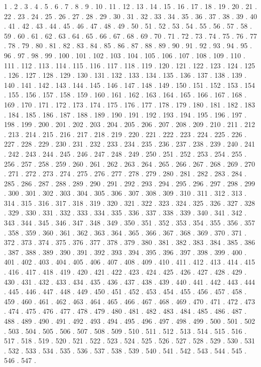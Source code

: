\documentclass[10pt]{article}
\begin{document}
\begin{Schunk}
\begin{Soutput}
1 . 2 . 3 . 4 . 5 . 6 . 7 . 8 . 9 . 10 . 11 . 12 . 13 . 14 . 15 . 16 . 17 . 18 . 19 . 20 . 21 . 22 . 23 . 24 . 25 . 26 . 27 . 28 . 29 . 30 . 31 . 32 . 33 . 34 . 35 . 36 . 37 . 38 . 39 . 40 . 41 . 42 . 43 . 44 . 45 . 46 . 47 . 48 . 49 . 50 . 51 . 52 . 53 . 54 . 55 . 56 . 57 . 58 . 59 . 60 . 61 . 62 . 63 . 64 . 65 . 66 . 67 . 68 . 69 . 70 . 71 . 72 . 73 . 74 . 75 . 76 . 77 . 78 . 79 . 80 . 81 . 82 . 83 . 84 . 85 . 86 . 87 . 88 . 89 . 90 . 91 . 92 . 93 . 94 . 95 . 96 . 97 . 98 . 99 . 100 . 101 . 102 . 103 . 104 . 105 . 106 . 107 . 108 . 109 . 110 . 111 . 112 . 113 . 114 . 115 . 116 . 117 . 118 . 119 . 120 . 121 . 122 . 123 . 124 . 125 . 126 . 127 . 128 . 129 . 130 . 131 . 132 . 133 . 134 . 135 . 136 . 137 . 138 . 139 . 140 . 141 . 142 . 143 . 144 . 145 . 146 . 147 . 148 . 149 . 150 . 151 . 152 . 153 . 154 . 155 . 156 . 157 . 158 . 159 . 160 . 161 . 162 . 163 . 164 . 165 . 166 . 167 . 168 . 169 . 170 . 171 . 172 . 173 . 174 . 175 . 176 . 177 . 178 . 179 . 180 . 181 . 182 . 183 . 184 . 185 . 186 . 187 . 188 . 189 . 190 . 191 . 192 . 193 . 194 . 195 . 196 . 197 . 198 . 199 . 200 . 201 . 202 . 203 . 204 . 205 . 206 . 207 . 208 . 209 . 210 . 211 . 212 . 213 . 214 . 215 . 216 . 217 . 218 . 219 . 220 . 221 . 222 . 223 . 224 . 225 . 226 . 227 . 228 . 229 . 230 . 231 . 232 . 233 . 234 . 235 . 236 . 237 . 238 . 239 . 240 . 241 . 242 . 243 . 244 . 245 . 246 . 247 . 248 . 249 . 250 . 251 . 252 . 253 . 254 . 255 . 256 . 257 . 258 . 259 . 260 . 261 . 262 . 263 . 264 . 265 . 266 . 267 . 268 . 269 . 270 . 271 . 272 . 273 . 274 . 275 . 276 . 277 . 278 . 279 . 280 . 281 . 282 . 283 . 284 . 285 . 286 . 287 . 288 . 289 . 290 . 291 . 292 . 293 . 294 . 295 . 296 . 297 . 298 . 299 . 300 . 301 . 302 . 303 . 304 . 305 . 306 . 307 . 308 . 309 . 310 . 311 . 312 . 313 . 314 . 315 . 316 . 317 . 318 . 319 . 320 . 321 . 322 . 323 . 324 . 325 . 326 . 327 . 328 . 329 . 330 . 331 . 332 . 333 . 334 . 335 . 336 . 337 . 338 . 339 . 340 . 341 . 342 . 343 . 344 . 345 . 346 . 347 . 348 . 349 . 350 . 351 . 352 . 353 . 354 . 355 . 356 . 357 . 358 . 359 . 360 . 361 . 362 . 363 . 364 . 365 . 366 . 367 . 368 . 369 . 370 . 371 . 372 . 373 . 374 . 375 . 376 . 377 . 378 . 379 . 380 . 381 . 382 . 383 . 384 . 385 . 386 . 387 . 388 . 389 . 390 . 391 . 392 . 393 . 394 . 395 . 396 . 397 . 398 . 399 . 400 . 401 . 402 . 403 . 404 . 405 . 406 . 407 . 408 . 409 . 410 . 411 . 412 . 413 . 414 . 415 . 416 . 417 . 418 . 419 . 420 . 421 . 422 . 423 . 424 . 425 . 426 . 427 . 428 . 429 . 430 . 431 . 432 . 433 . 434 . 435 . 436 . 437 . 438 . 439 . 440 . 441 . 442 . 443 . 444 . 445 . 446 . 447 . 448 . 449 . 450 . 451 . 452 . 453 . 454 . 455 . 456 . 457 . 458 . 459 . 460 . 461 . 462 . 463 . 464 . 465 . 466 . 467 . 468 . 469 . 470 . 471 . 472 . 473 . 474 . 475 . 476 . 477 . 478 . 479 . 480 . 481 . 482 . 483 . 484 . 485 . 486 . 487 . 488 . 489 . 490 . 491 . 492 . 493 . 494 . 495 . 496 . 497 . 498 . 499 . 500 . 501 . 502 . 503 . 504 . 505 . 506 . 507 . 508 . 509 . 510 . 511 . 512 . 513 . 514 . 515 . 516 . 517 . 518 . 519 . 520 . 521 . 522 . 523 . 524 . 525 . 526 . 527 . 528 . 529 . 530 . 531 . 532 . 533 . 534 . 535 . 536 . 537 . 538 . 539 . 540 . 541 . 542 . 543 . 544 . 545 . 546 . 547 . 
\end{Soutput}
\end{Schunk}
\end{document}
